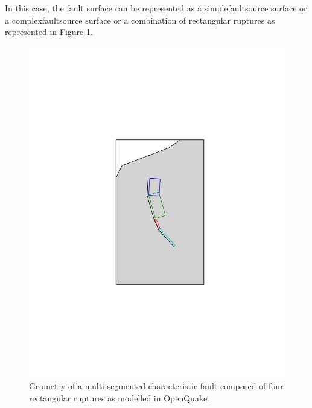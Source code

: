 In this case, the fault surface can be represented as a 
\gls{simplefaultsource} surface or a \gls{complexfaultsource} 
surface or a combination of rectangular ruptures as represented 
in Figure \ref{fig:char_fault_source}.
\begin{figure}[!ht]
\centering
\includegraphics[width=15cm]{figures/hazard/multi_surface.pdf}
\caption{Geometry of a multi-segmented characteristic fault composed of four
	rectangular ruptures as modelled in OpenQuake.}
\label{fig:char_fault_source}
\end{figure}
%
